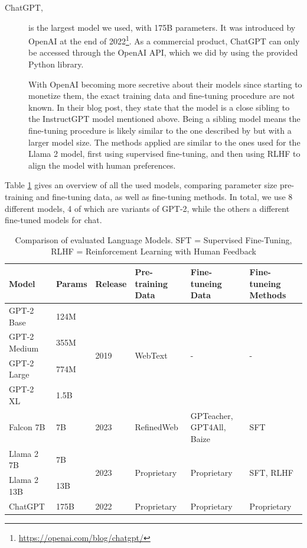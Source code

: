 \begin{description}
\item[ChatGPT,] is the largest model we used, with 175B parameters. 
It was introduced by OpenAI at the end of 2022\footnote{\url{https://openai.com/blog/chatgpt/}}.
As a commercial product, ChatGPT can only be accessed through the OpenAI API, which we did by using the provided Python library.

With OpenAI becoming more secretive about their models since starting to monetize them, the exact training data and fine-tuning procedure are not known.
In their blog post, they state that the model is a close sibling to the InstructGPT model mentioned above.
Being a sibling model means the fine-tuning procedure is likely similar to the one described by \cite{ouyang:2022:Training} but with a larger model size.
The methods applied are similar to the ones used for the Llama 2 model, first using supervised fine-tuning, and then using RLHF to align the model with human preferences.
\end{description}

Table \ref{tab:language-models} gives an overview of all the used models, comparing parameter size pre-training and fine-tuning data, as well as fine-tuning methods.
In total, we use 8 different models, 4 of which are variants of GPT-2, while the others a different fine-tuned models for chat.
\begin{table}[tb]
\centering
\begin{tabularx}{\textwidth}{lllXXX}
\hline
\textbf{Model} & \textbf{Params} & \textbf{Release} & \textbf{Pre-training Data} & \textbf{Fine-tuneing Data} & \textbf{Fine-tuneing Methods} \\
\hline
GPT-2 Base    & 124M & \multirow{4}{*}{2019} & \multirow{4}{*}{WebText} & \multirow{4}{*}{-} & \multirow{4}{*}{-} \\
GPT-2 Medium  & 355M &                      &                          &  &  \\
GPT-2 Large   & 774M &                      &                          &  &  \\
GPT-2 XL      & 1.5B &                      &                          &  &  \\
\hline
Falcon 7B              & 7B      & 2023 & RefinedWeb           & GPTeacher, GPT4All, Baize & SFT \\
\hline
Llama 2 7B & 7B    & \multirow{2}{*}{2023} & \multirow{2}{*}{Proprietary} & \multirow{2}{*}{Proprietary} & \multirow{2}{*}{SFT, RLHF} \\
Llama 2 13B   & 13B   &  &                        &                         &  \\
\hline
ChatGPT                & 175B   & 2022 & Proprietary                & Proprietary & Proprietary \\
\hline
\end{tabularx}
\caption{Comparison of evaluated Language Models. SFT = Supervised Fine-Tuning, RLHF = Reinforcement Learning with Human Feedback}\label{tab:language-models}
\end{table}


